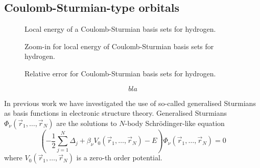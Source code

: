 \subsection{Coulomb-Sturmian-type orbitals}
\label{sec:BasisCS}




\begin{figure}
	\centering
	\caption{Local energy of a Coulomb-Sturmian basis sets for hydrogen.}
	\label{fig:LocalEnergyCS}
\end{figure}

\begin{figure}
	\centering
	\caption{Zoom-in for local energy of Coulomb-Sturmian basis sets for hydrogen.}
	\label{fig:LocalEnergyCSZoom}
\end{figure}

\begin{figure}
	\centering
	\caption{Relative error for Coulomb-Sturmian basis sets for hydrogen.}
	\label{fig:LocalEnergyCS}
\end{figure}



\cite{Rotenberg1970}
\cite{Gruzdev1990}
\cite{Avery2006} %
\cite{Avery2011} %
\cite{Morales2016}
\cite{Avery2017} %



\begin{equation}
	bla
	\label{eqn:CSEquation}
\end{equation}



In previous work we have investigated the use of so-called generalised Sturmians as basis functions
in electronic structure theory.
%
\newcommand{\rpack}{\vec{r}_1, \ldots, \vec{r}_N}
Generalised Sturmians $\Phi_\nu(\rpack)$ are the solutions to $N$-body Schrödinger-like equation
\begin{equation}
	\left( -\frac12 \sum_{j=1}^N \Delta_j + \beta_\nu V_0(\rpack) - E \right) \Phi_\nu(\rpack) = 0
	\label{eqn:GenSturm}
\end{equation}
where $V_0(\rpack)$ is
a zero-th order potential.


